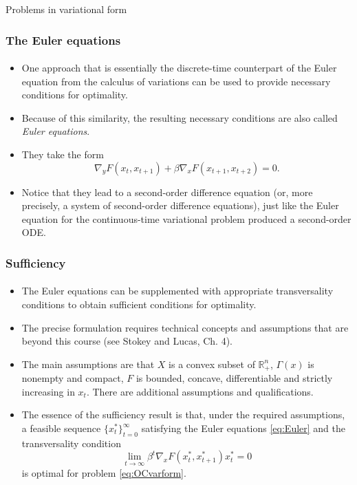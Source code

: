 \documentclass[10pt]{beamer}
\theoremstyle{definition}
\begin{document}
\begin{section}{Problems in variational form}
\begin{frame}[fragile]
\frametitle{The Euler equations}
\framesubtitle{}
\begin{itemize}\itemsep1em
\item One approach that is essentially the discrete-time counterpart of the Euler equation from the calculus of variations can be used to provide necessary conditions for optimality.
\item Because of this similarity, the resulting necessary conditions are also called \emph{Euler equations}.
\item They take the form
\begin{equation}\label{eq:Euler}
\nabla_y F(x_t,x_{t+1})+\beta \nabla_x F(x_{t+1},x_{t+2})=0.
\end{equation}
\item Notice that they lead to a second-order difference equation (or, more precisely, a system of second-order difference equations), just like the Euler equation for the continuous-time variational problem produced a second-order ODE.
\end{itemize}
\end{frame}

\begin{frame}[fragile]
\frametitle{Sufficiency}
\framesubtitle{}
\begin{itemize}\itemsep1em
\item The Euler equations can be supplemented with appropriate transversality conditions to obtain sufficient conditions for optimality.
\item The precise formulation requires technical concepts and assumptions that are beyond this course (see Stokey and Lucas, Ch. 4).
\item The main assumptions are that $ X $ is a convex subset of $ \mathbb{R}^n_{+} $, $ \Gamma (x) $ is nonempty and compact, $ F $ is bounded, concave, differentiable and strictly increasing in $ x_t $. There are additional assumptions and qualifications.
\item The essence of the sufficiency result is that, under the required assumptions, a feasible sequence $ \{x^*_t\}_{t=0}^{\infty} $ satisfying the Euler equations \eqref{eq:Euler} and the transversality condition \[ \lim\limits_{t\rightarrow \infty}\beta^t \nabla_x F(x_t^*,x_{t+1}^*) x^*_t = 0 \] is optimal for problem \eqref{eq:OCvarform}.
\end{itemize}


\end{frame}




\end{section}
\end{document}
